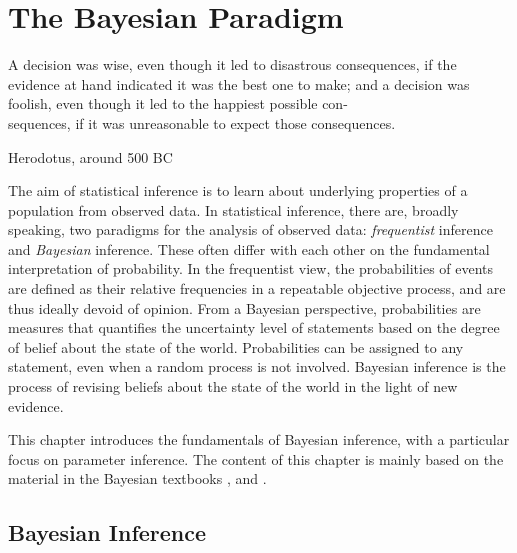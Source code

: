 \chapter{The Bayesian Paradigm}\label{chap:bayesian}

\epigraph{A decision was wise, even though it led to disastrous consequences, if the evidence at hand indicated it was the best one to make; and a decision was foolish, even though it led to the happiest possible con-\\sequences, if it was unreasonable to expect those consequences.}{Herodotus, around 500 BC}


The aim of statistical inference is to learn about underlying properties of a population from observed data.  In statistical inference, there are, broadly speaking, two paradigms for the analysis of observed data: \textit{frequentist} inference and \textit{Bayesian} inference. These often differ with each other on the fundamental interpretation of probability. In the frequentist view, the probabilities of events are defined as their relative frequencies in a repeatable objective process, and are thus ideally devoid of opinion. From a Bayesian perspective, probabilities are measures that quantifies the uncertainty level of statements based on the degree of belief about the state of the world. Probabilities can be assigned to any statement, even when a random process is not involved. Bayesian inference is the process of revising beliefs about the state of the world in the light of new evidence.     


This chapter introduces the fundamentals of Bayesian inference, with a particular focus on parameter inference. The content of this chapter is mainly based on the material in the Bayesian textbooks \cite{BDA}, \cite{BAP} and \cite{Sivia}.


\section{Bayesian Inference}\label{sec:bayes_paradigm}

